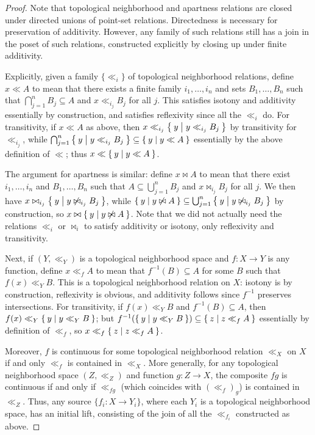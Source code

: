 \documentclass{article}
\def\inv{^{-1}}
\begin{document}
\begin{proof}
  Note that topological neighborhood and apartness relations are closed under directed unions of point-set relations.
  Directedness is necessary for preservation of additivity.
  However, any family of such relations still has a join in the poset of such relations, constructed explicitly by closing up under finite additivity.

  Explicitly, given a family $\{\ll_i\}$ of topological neighborhood relations, define $x\ll A$ to mean that there exists a finite family $i_1,\dots,i_n$ and sets $B_1,\dots, B_n$ such that $\bigcap_{j=1}^n B_j \subseteq A$ and $x\ll_{i_j} B_j$ for all $j$.
  This satisfies isotony and additivity essentially by construction, and satisfies reflexivity since all the $\ll_i$ do.
  For transitivity, if $x\ll A$ as above, then $x\ll_{i_j} \Set{y|y\ll_{i_j} B_j}$ by transitivity for $\ll_{i_j}$, while $\bigcap_{j=1}^n \Set{y|y\ll_{i_j} B_j} \subseteq \Set{y|y\ll A}$ essentially by the above definition of $\ll$; thus $x\ll \Set{y|y\ll A}$.

  The argument for apartness is similar: define $x\bowtie A$ to mean that there exist $i_1,\dots,i_n$ and $B_1,\dots, B_n$ such that $A\subseteq \bigcup_{j=1}^n B_j$ and $x\bowtie_{i_j} B_j$ for all $j$.
  We then have $x\bowtie_{i_j} \Set{y|y\not\bowtie_{i_j} B_j}$, while $\Set{y|y\not\bowtie A} \subseteq \bigcup_{j=1}^n\Set{y|y\not\bowtie_{i_j} B_j}$ by construction, so $x\bowtie \Set{y|y\not\bowtie A}$.
  Note that we did not actually need the relations $\ll_i$ or $\bowtie_i$ to satisfy additivity or isotony, only reflexivity and transitivity.

  Next, if $(Y,\ll_Y)$ is a topological neighborhood space and $f:X\to Y$ is any function, define $x\ll_f A$ to mean that $f\inv(B)\subseteq A$ for some $B$ such that $f(x)\ll_Y B$.
  This is a topological neighborhood relation on $X$: isotony is by construction, reflexivity is obvious, and additivity follows since $f\inv$ preserves intersections.
  For transitivity, if $f(x)\ll_Y B$ and $f\inv(B)\subseteq A$, then $f(x)\ll_Y \Set{y|y\ll_Y B}$; but $f\inv(\setof{y|y\ll_Y B}) \subseteq \setof{z|z\ll_f A}$ essentially by definition of $\ll_f$, so $x \ll_f \Set{z|z\ll_f A}$.

  Moreover, $f$ is continuous for some topological neighborhood relation $\ll_X$ on $X$ if and only $\ll_f$ is contained in $\ll_X$.
  More generally, for any topological neighborhood space $(Z,\ll_Z)$ and function $g:Z\to X$, the composite $f g$ is continuous if and only if $\ll_{f g}$ (which coincides with $(\ll_f)_g$) is contained in $\ll_Z$.
  Thus, any source $\{ f_i : X \to Y_i \}$, where each $Y_i$ is a topological neighborhood space, has an initial lift, consisting of the join of all the $\ll_{f_i}$ constructed as above.


\end{proof}
\end{document}
